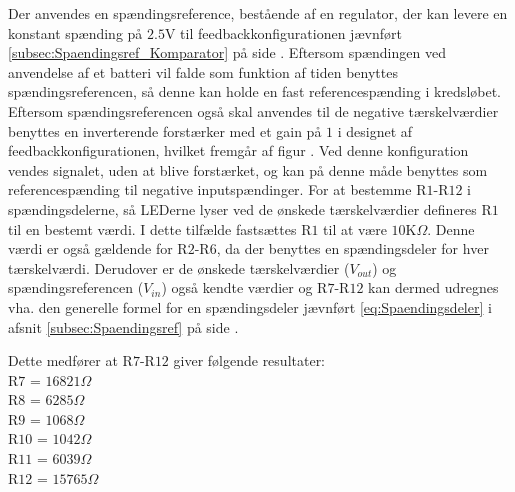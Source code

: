 \noindent Der anvendes en spændingsreference, bestående af en regulator, der kan levere en konstant spænding på $2.5$V til feedbackkonfigurationen jævnført \ref{subsec:Spaendingsref_Komparator} på side \pageref{subsec:Spaendingsref_Komparator}. Eftersom spændingen ved anvendelse af et batteri vil falde som funktion af tiden benyttes spændingsreferencen, så denne kan holde en fast referencespænding i kredsløbet. Eftersom spændingsreferencen også skal anvendes til de negative tærskelværdier benyttes en inverterende forstærker med et gain på $1$ i designet af feedbackkonfigurationen, hvilket fremgår af figur . Ved denne konfiguration vendes signalet, uden at blive forstærket, og kan på denne måde benyttes som referencespænding til negative inputspændinger. For at bestemme R$1$-R$12$ i spændingsdelerne, så LEDerne lyser ved de ønskede tærskelværdier defineres R$1$ til en bestemt værdi. I dette tilfælde fastsættes R$1$ til at være $10$K$\Omega$. Denne værdi er også gældende for R$2$-R$6$, da der benyttes en spændingsdeler for hver tærskelværdi. Derudover er de ønskede tærskelværdier ($V_{out}$) og spændingsreferencen ($V_{in}$) også kendte værdier og R$7$-R$12$ kan dermed udregnes vha. den generelle formel for en spændingsdeler jævnført \eqref{eq:Spaendingsdeler} i afsnit \ref{subsec:Spaendingsref} på side \pageref{subsec:Spaendingsref}. 

\noindent Dette medfører at R$7$-R$12$ giver følgende resultater:\\
R$7$ = $16821\Omega$ \\
R$8$ = $6285\Omega$ \\
R$9$ = $1068\Omega$ \\
R$10$ = $1042\Omega$ \\
R$11$ = $6039\Omega$ \\
R$12$ = $15765\Omega$ \\



